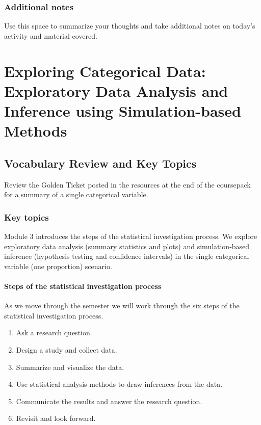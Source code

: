 \documentclass[
]{report}
\begin{document}
\subsection{Additional notes}\label{additional-notes-4}

Use this space to summarize your thoughts and take additional notes on today's activity and material covered.

\newpage

\chapter{Exploring Categorical Data: Exploratory Data Analysis and Inference using Simulation-based Methods}\label{exploring-categorical-data-exploratory-data-analysis-and-inference-using-simulation-based-methods}

\section{Vocabulary Review and Key Topics}\label{vocabulary-review-and-key-topics-2}

Review the Golden Ticket posted in the resources at the end of the coursepack for a summary of a single categorical variable.

\subsection{Key topics}\label{key-topics-2}

Module 3 introduces the steps of the statistical investigation process. We explore exploratory data analysis (summary statistics and plots) and simulation-based inference (hypothesis testing and confidence intervals) in the single categorical variable (one proportion) scenario.

\subsubsection*{Steps of the statistical investigation process}\label{steps-of-the-statistical-investigation-process-1}

As we move through the semester we will work through the six steps of the statistical investigation process.

\begin{enumerate}
\def\labelenumi{\arabic{enumi}.}
\item
  Ask a research question.
\item
  Design a study and collect data.
\item
  Summarize and visualize the data.
\item
  Use statistical analysis methods to draw inferences from the data.
\item
  Communicate the results and answer the research question.
\item
  Revisit and look forward.
\end{enumerate}
\end{document}
